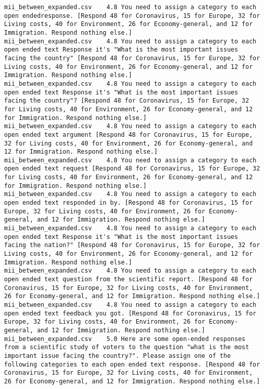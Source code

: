 \begin{lstlisting}[label=lst:promptvariants]
mii_between_expanded.csv	4.8	You need to assign a category to each open endedresponse. [Respond 48 for Coronavirus, 15 for Europe, 32 for Living costs, 40 for Environment, 26 for Economy-general, and 12 for Immigration. Respond nothing else.]
mii_between_expanded.csv	4.8	You need to assign a category to each open ended text Response it's "What is the most important issues facing the country" [Respond 48 for Coronavirus, 15 for Europe, 32 for Living costs, 40 for Environment, 26 for Economy-general, and 12 for Immigration. Respond nothing else.]
mii_between_expanded.csv	4.8	You need to assign a category to each open ended text Response it's "What is the most important issues facing the country"? [Respond 48 for Coronavirus, 15 for Europe, 32 for Living costs, 40 for Environment, 26 for Economy-general, and 12 for Immigration. Respond nothing else.]
mii_between_expanded.csv	4.8	You need to assign a category to each open ended text argument [Respond 48 for Coronavirus, 15 for Europe, 32 for Living costs, 40 for Environment, 26 for Economy-general, and 12 for Immigration. Respond nothing else.]
mii_between_expanded.csv	4.8	You need to assign a category to each open ended text request [Respond 48 for Coronavirus, 15 for Europe, 32 for Living costs, 40 for Environment, 26 for Economy-general, and 12 for Immigration. Respond nothing else.]
mii_between_expanded.csv	4.8	You need to assign a category to each open ended text responded in by. [Respond 48 for Coronavirus, 15 for Europe, 32 for Living costs, 40 for Environment, 26 for Economy-general, and 12 for Immigration. Respond nothing else.]
mii_between_expanded.csv	4.8	You need to assign a category to each open ended text Response it's "What is the most important issues facing the nation?" [Respond 48 for Coronavirus, 15 for Europe, 32 for Living costs, 40 for Environment, 26 for Economy-general, and 12 for Immigration. Respond nothing else.]
mii_between_expanded.csv	4.8	You need to assign a category to each open ended text question from the scientific report. [Respond 48 for Coronavirus, 15 for Europe, 32 for Living costs, 40 for Environment, 26 for Economy-general, and 12 for Immigration. Respond nothing else.]
mii_between_expanded.csv	4.8	You need to assign a category to each open ended text feedback you got. [Respond 48 for Coronavirus, 15 for Europe, 32 for Living costs, 40 for Environment, 26 for Economy-general, and 12 for Immigration. Respond nothing else.]
mii_between_expanded.csv	5.0	Here are some open-ended responses from a scientific study of voters to the question "what is the most important issue facing the country?". Please assign one of the following categories to each open ended text response. [Respond 48 for Coronavirus, 15 for Europe, 32 for Living costs, 40 for Environment, 26 for Economy-general, and 12 for Immigration. Respond nothing else.]

\end{lstlisting}
